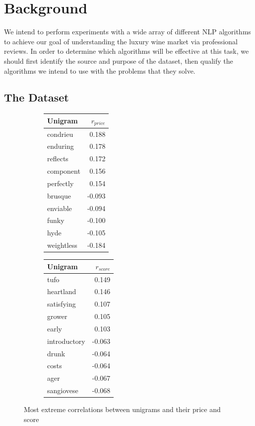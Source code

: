 \documentclass[12pt]{IEEEtran}
\begin{document}
\section{Background}
    We intend to perform experiments with a wide array of different NLP algorithms to achieve our goal of understanding the luxury wine market via professional reviews. In order to determine which algorithms will be effective at this task, we should first identify the source and purpose of the dataset, then qualify the algorithms we intend to use with the problems that they solve.

\subsection{The Dataset}

\begin{figure}[b]
    \centering
    \begin{subfigure}{0.4\columnwidth}
    \small
    \begin{tabular}{ |l|r| }
        \hline
        Unigram & $r_{price}$ \\
        \hline
        \hline
        condrieu & 0.188 \\
	    enduring & 0.178 \\ 
	    reflects & 0.172 \\
	    component & 0.156 \\
	    perfectly & 0.154 \\
        \hline
        brusque & -0.093 \\
        enviable & -0.094 \\
        funky & -0.100 \\
        hyde & -0.105 \\
        weightless & -0.184 \\
        \hline
    \end{tabular}
    \end{subfigure}
    \begin{subfigure}{0.4\columnwidth}
    \small
    \begin{tabular}{ |l|r| }
        \hline
        Unigram & $r_{score}$ \\
        \hline
        \hline
        tufo & 0.149 \\
        heartland & 0.146 \\
        satisfying & 0.107 \\
        grower & 0.105 \\
        early & 0.103 \\
        \hline
        introductory & -0.063 \\
        drunk & -0.064 \\
        costs & -0.064 \\
        ager & -0.067 \\
        sangiovese & -0.068 \\
        \hline
    \end{tabular}
    \end{subfigure}
    \caption{Most extreme correlations between unigrams and their price and score}
    \label{correlations}
\end{figure}
\end{document}
